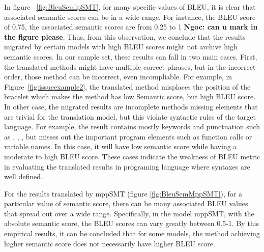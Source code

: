 In figure ~\ref{fig:BleuSemlpSMT}, for many specific values of BLEU, it 
is clear that associated semantic scores can be in a wide range. For 
instance, the BLEU score of 0.75, the associated semantic scores are 
from 0.25 to 1 \textbf{Ngoc: can u mark in the figure please}. Thus, from this 
observation, we conclude that the results migrated by certain models 
with high BLEU scores might not archive high semantic scores. 
%
In our sample set, these results can fall in two main cases. 
First, the translated methods might have multiple correct phrases, but in the 
incorrect order, those method can be incorrect, even incompliable.
%
For example, in Figure~\ref{fig:issueexample2}, the translated method
misplaces the position of the bracelet which makes the method has low
Semantic score, but high BLEU score. 
%
In other case, the migrated results are incomplete methods missing elements
that are trivial for the translation model, but this violate syntactic rules 
of the target language. For example, the result contains mostly keywords and
punctuation such as , , \code{()}, but misses
out the important program elements such as function calls or variable
names. In this case, it will have low semantic score while having
a moderate to high BLEU score. These cases indicate the weakness of BLEU metric 
in evaluating the translated results in programing language where syntaxes are well defined.

For the results translated by mppSMT (figure \ref{fig:BleuSemMppSMT}), 
for a particular value of  semantic score, there can be many associated 
BLEU values that spread out over a wide range. Specifically, in the model 
mppSMT, with the absolute semantic score, the BLEU scores can vary greatly 
between 0.5-1. By this empirical results, it can be concluded that for 
some models, the method achieving higher semantic score does not necessarily 
have higher BLEU score. 

